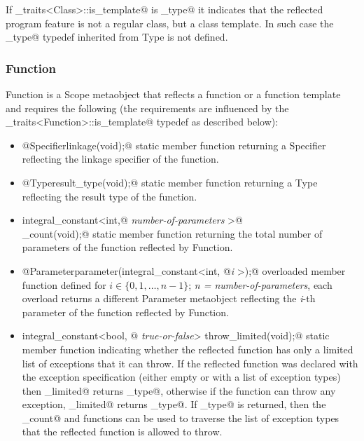 If \verb@metaobject_traits<Class>::is_template@ is \verb@true_type@ it indicates 
that the reflected program feature is not a regular class, but a class template.
In such case the \verb@original_type@ typedef inherited from {\metaobject Type}
is not defined.

\subsubsection{Function}

{\metaobject Function} is a {\metaobject Scope} metaobject that reflects a function
or a function template and requires the following (the requirements are influenced
by the \verb@metaobject_traits<Function>::is_template@ typedef as described below):

\begin{itemize}
	\item{\verb@static @{\metaobject Specifier}\verb@ linkage(void);@} static member function returning
	a {\metaobject Specifier} reflecting the linkage specifier of the function.

	\item{\verb@static @{\metaobject Type}\verb@ result_type(void);@} static member function returning
	a {\metaobject Type} reflecting the result type of the function.

	\item{\verb@static integral_constant<int,@ {\em number-of-parameters}
	\verb@>@\\\verb@parameter_count(void);@} static member function returning the total number
	of parameters of the function reflected by {\metaobject Function}.

	\item{\verb@static @{\metaobject Parameter}\verb@ parameter(integral_constant<int, @{\em i}
	\verb@>);@} overloaded member function defined
	for $i \in \{0, 1, \dots, n-1\}$; {\em n = number-of-parameters},
	each overload returns a different {\metaobject Parameter} metaobject reflecting the {\em i}-th parameter
	of the function reflected by {\metaobject Function}.

	\item{\verb@static integral_constant<bool, @ {\em true-or-false}\verb@> throw_limited(void);@}
	static member function indicating whether the reflected function has only a limited list of exceptions
	that it can throw. If the reflected function was declared with the \verb@throw@ exception specification
	(either empty or with a list of exception types) then \verb@throw_limited@ returns
	\verb@true_type@, otherwise if the function can throw any exception, \verb@throw_limited@ returns \verb@false_type@.
	If \verb@true_type@ is returned, then the \verb@exception_count@ and \verb@exception@ functions
	can be used to traverse the list of exception types that the reflected function is allowed
	to throw.


\end{itemize}
